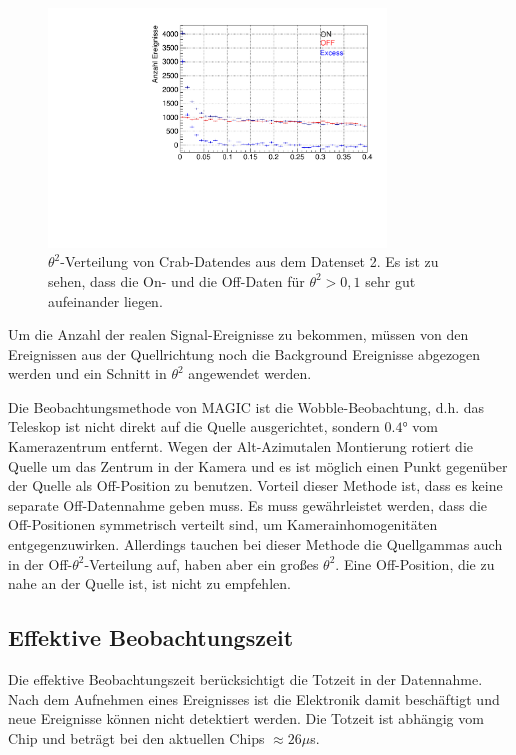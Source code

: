 \begin{figure}
    \centering
    \includegraphics[width=0.8\textwidth]{./Plots/04_MrkAnalyse/Datenset2/Crab_Theta2.pdf}
    \caption{$\theta^2$-Verteilung von Crab-Datendes aus dem Datenset 2. Es ist zu sehen, dass die On- und die Off-Daten für $\theta^2 > 0,1$ sehr gut aufeinander liegen.}
    \label{Disp}
\end{figure}

Um die Anzahl der realen Signal-Ereignisse zu bekommen, müssen von den Ereignissen aus der Quellrichtung noch die Background Ereignisse abgezogen werden und ein Schnitt in $\theta^2$ angewendet werden.

Die Beobachtungsmethode von MAGIC ist die Wobble-Beobachtung, d.h. das Teleskop ist nicht direkt auf die Quelle ausgerichtet, sondern $0.4°$ vom Kamerazentrum entfernt.
Wegen der Alt-Azimutalen Montierung rotiert die Quelle um das Zentrum in der Kamera und es ist möglich einen Punkt gegenüber der Quelle als Off-Position zu benutzen.
Vorteil dieser Methode ist, dass es keine separate Off-Datennahme geben muss.
Es muss gewährleistet werden, dass die Off-Positionen symmetrisch verteilt sind, um Kamerainhomogenitäten entgegenzuwirken.
Allerdings tauchen bei dieser Methode die Quellgammas auch in der Off-$\theta^2$-Verteilung auf, haben aber ein großes $\theta^2$.
Eine Off-Position, die zu nahe an der Quelle ist, ist nicht zu empfehlen.

\subsection{Effektive Beobachtungszeit}
Die effektive Beobachtungszeit berücksichtigt die Totzeit in der Datennahme.
Nach dem Aufnehmen eines Ereignisses ist die Elektronik damit beschäftigt und neue Ereignisse können nicht detektiert werden.
Die Totzeit ist abhängig vom Chip und beträgt bei den aktuellen Chips $\approx 26\mu$s.

